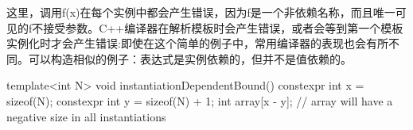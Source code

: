 这里，调用f(x)在每个实例中都会产生错误，因为f是一个非依赖名称，而且唯一可见的f不接受参数。C++编译器在解析模板时会产生错误，或者会等到第一个模板实例化时才会产生错误:即使在这个简单的例子中，常用编译器的表现也会有所不同。可以构造相似的例子：表达式是实例依赖的，但并不是值依赖的。

\begin{cpp}
template<int N> void instantiationDependentBound()
{
	constexpr int x = sizeof(N);
	constexpr int y = sizeof(N) + 1;
	int array[x - y]; // array will have a negative size in all instantiations
}
\end{cpp}











